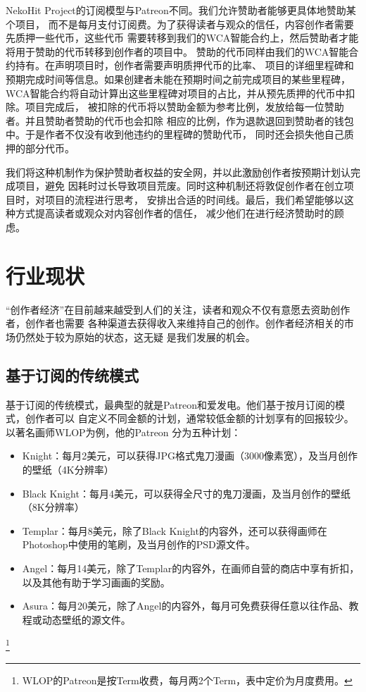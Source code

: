 \documentclass[11pt,UTF8,a4paper]{ctexart}
\begin{document}
    NekoHit Project的订阅模型与Patreon不同。我们允许赞助者能够更具体地赞助某个项目，
    而不是每月支付订阅费。为了获得读者与观众的信任，内容创作者需要先质押一些代币，这些代币
    需要转移到我们的WCA智能合约上，然后赞助者才能将用于赞助的代币转移到创作者的项目中。
    赞助的代币同样由我们的WCA智能合约持有。在声明项目时，创作者需要声明质押代币的比率、
    项目的详细里程碑和预期完成时间等信息。如果创建者未能在预期时间之前完成项目的某些里程碑，
    WCA智能合约将自动计算出这些里程碑对项目的占比，并从预先质押的代币中扣除。项目完成后，
    被扣除的代币将以赞助金额为参考比例，发放给每一位赞助者。并且赞助者赞助的代币也会扣除
    相应的比例，作为退款退回到赞助者的钱包中。于是作者不仅没有收到他违约的里程碑的赞助代币，
    同时还会损失他自己质押的部分代币。

    我们将这种机制作为保护赞助者权益的安全网，并以此激励创作者按预期计划认完成项目，避免
    因耗时过长导致项目荒废。同时这种机制还将敦促创作者在创立项目时，对项目的流程进行思考，
    安排出合适的时间线。最后，我们希望能够以这种方式提高读者或观众对内容创作者的信任，
    减少他们在进行经济赞助时的顾虑。


    \section{行业现状}\label{sec:now}

    “创作者经济”在目前越来越受到人们的关注，读者和观众不仅有意愿去资助创作者，创作者也需要
    各种渠道去获得收入来维持自己的创作。创作者经济相关的市场仍然处于较为原始的状态，这无疑
    是我们发展的机会。

    \subsection{基于订阅的传统模式}\label{subsec:tradition_patreon}

    基于订阅的传统模式，最典型的就是Patreon和爱发电。他们基于按月订阅的模式，创作者可以
    自定义不同金额的计划，通常较低金额的计划享有的回报较少。以著名画师WLOP为例，他的Patreon
    分为五种计划\cite{wlop_patreon}：
    \begin{itemize}
        \item Knight：每月2美元，可以获得JPG格式鬼刀漫画（3000像素宽），及当月创作的壁纸（4K分辨率）
        \item Black Knight：每月4美元，可以获得全尺寸的鬼刀漫画，及当月创作的壁纸（8K分辨率）
        \item Templar：每月8美元，除了Black Knight的内容外，还可以获得画师在Photoshop中使用的笔刷，及当月创作的PSD源文件。
        \item Angel：每月14美元，除了Templar的内容外，在画师自营的商店中享有折扣，以及其他有助于学习画画的奖励。
        \item Asura：每月20美元，除了Angel的内容外，每月可免费获得任意以往作品、教程或动态壁纸的源文件。
    \end{itemize}\footnote{WLOP的Patreon是按Term收费，每月两2个Term，表中定价为月度费用。}
\end{document}
